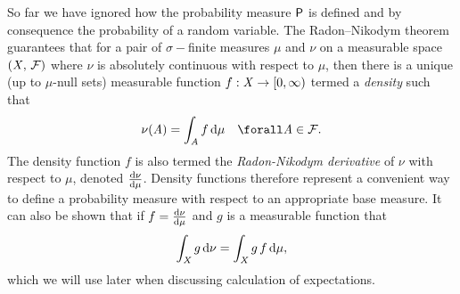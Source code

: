 So far we have ignored how the probability measure $\mathsf{P}$ is defined and by consequence the probability of a random variable. 
The Radon--Nikodym theorem guarantees that for a pair of $\sigma-$finite measures $\mu$ and $\nu$ on a measurable space $(\mathit{X},\,\mathcal{F})$ where $\nu$ is absolutely continuous with respect to $\mu$,  then there is a unique (up to $\mu$-null sets) measurable function $f : \mathit{X} \to [0,\infty)$ termed a \emph{density} such that
\begin{equation}\label{eq:radon-nikodym}
  \nu(\set{A}) = \int_{\set{A}} f\,\dr\mu
  \quad \forall \set{A} \in \sset{F}.
\end{equation}
The density function $f$ is also termed the \emph{Radon-Nikodym derivative} of $\nu$ with respect to $\mu$, denoted $\frac{\mathrm{d} \nu}{\mathrm{d} \mu}$. Density functions therefore represent a convenient way to define a probability measure with respect to an appropriate base measure. %
It can also be shown that if $f = \frac{\mathrm{d} \nu}{\mathrm{d} \mu}$ and  $g$ is a 	 measurable function that
\begin{equation}\label{eq:integral-wrt-density}
  \int_{\mathit{X}} g\,\mathrm{d}\nu = \int_{\mathit{X}} g\, f\,\mathrm{d}\mu,
\end{equation}
which we will use later when discussing calculation of expectations.

